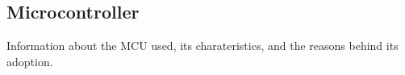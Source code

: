 \subsection{Microcontroller}

Information about the MCU used, its charateristics, and the reasons behind its adoption.

